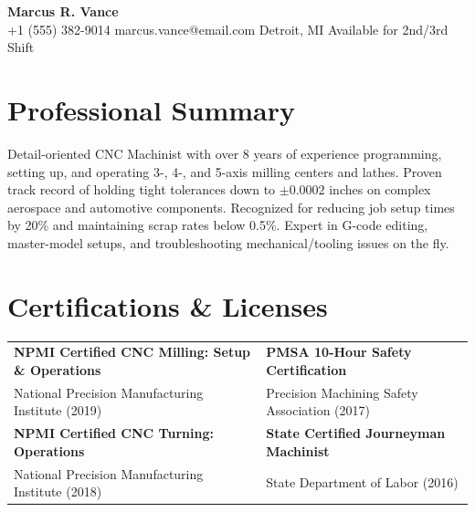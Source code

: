 \documentclass[10pt,letterpaper]{article}
\newcommand{\contactitem}[2]{{\color{accent}#1}\hspace{0.3em}#2}
\begin{document}
\begin{center}
    {\Huge\bfseries\color{primary} Marcus R. Vance} \\[0.5em]
    \small
    \contactitem{\faPhone}{+1 (555) 382-9014} \hspace{1.5em}
    \contactitem{\faEnvelope}{marcus.vance@email.com} \hspace{1.5em}
    \contactitem{\faMapMarker}{Detroit, MI} \hspace{1.5em}
    \contactitem{\faCalendar}{Available for 2nd/3rd Shift}
\end{center}

\vspace{0.5em}

\section*{Professional Summary}
Detail-oriented CNC Machinist with over 8 years of experience programming, setting up, and operating 3-, 4-, and 5-axis milling centers and lathes. Proven track record of holding tight tolerances down to \(\pm 0.0002\) inches on complex aerospace and automotive components. Recognized for reducing job setup times by 20\% and maintaining scrap rates below 0.5\%. Expert in G-code editing, master-model setups, and troubleshooting mechanical/tooling issues on the fly.

\section*{Certifications \& Licenses}
\begin{tabularx}{\textwidth}{X X}
    \textbf{NPMI Certified CNC Milling: Setup \& Operations} & \textbf{PMSA 10-Hour Safety Certification} \\
    National Precision Manufacturing Institute (2019) & Precision Machining Safety Association (2017) \\[0.4em]
    \textbf{NPMI Certified CNC Turning: Operations} & \textbf{State Certified Journeyman Machinist} \\
    National Precision Manufacturing Institute (2018) & State Department of Labor (2016)
\end{tabularx}
\end{document}
